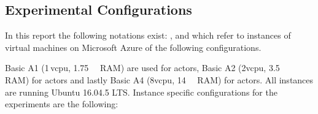 
    \subsection{Experimental Configurations\label{subsec:1_exp-conf}}
        In this report the following notations exist: \cli, \mw{} and \srv{} which refer
        to instances of virtual machines on Microsoft Azure of the following configurations.

        Basic A1 (1\,vcpu, \SI{1.75}{\giga\byte} RAM) are used for \srv{} actors, Basic A2 (2vcpu, \SI{3.5}{\giga\byte}
        RAM) for \cli{} actors and lastly Basic A4 (8vcpu, \SI{14}{\giga\byte} RAM) for \mw{} actors. All instances are
        running Ubuntu 16.04.5 LTS. Instance specific configurations for the experiments are the following:

